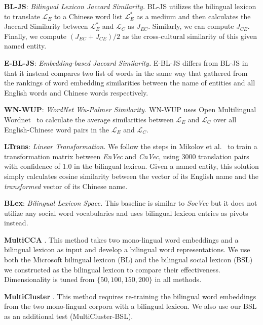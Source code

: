 \noindent
\textbf{BL-JS}: \textit{Bilingual Lexicon Jaccard Similarity.}
BL-JS utilizes the bilingual lexicon to translate $\mathcal{L}_E$  to a Chinese word list 
$\mathcal{L}_E^*$ as a medium and then calculates the Jaccard Similarity between 
$\mathcal{L}_E^*$ and $\mathcal{L}_C$ as $J_{EC}$. Similarly, we can compute $J_{CE}$. 
Finally, we compute $(J_{EC}+J_{CE})/{2}$ as the cross-cultural similarity 
of this given named entity.

\noindent
\textbf{E-BL-JS}: \textit {Embedding-based Jaccard Similarity.} 
E-BL-JS differs from BL-JS in that it instead compares two list of words in the same way that gathered from the
rankings of word embedding similarities between the name of entities and all English words 
and Chinese words respectively. 

\noindent
\textbf{WN-WUP}: \textit{WordNet Wu-Palmer Similarity.} 
WN-WUP uses Open Multilingual 
Wordnet~\cite{wang2013building} to calculate the average 
similarities between $\mathcal{L}_E$ and $\mathcal{L}_C$ over all English-Chinese word pairs in the $\mathcal{L}_E$ and $\mathcal{L}_C$.

\noindent\textbf{LTrans}: \textit {Linear Transformation.}
We follow the steps in Mikolov et al.~ 
to train a transformation matrix between \textit{EnVec} and \textit{CnVec}, 
using 3000 translation pairs with confidence of 1.0 in the bilingual lexicon. 
Given a named entity, this solution simply calculates cosine similarity 
between the vector of its English name and the \textit{transformed} vector 
of its Chinese name. 

\noindent\textbf{BLex}: \textit {Bilingual Lexicon Space.}
This baseline is similar to \textit{SocVec} but it does not 
utilize any social word vocabularies and  uses bilingual lexicon entries as pivots instead.
 
\noindent\textbf{MultiCCA}
\cite{ammar2016massively}. This method takes two mono-lingual word 
embeddings and a bilingual lexicon as input and develop a bilingual word 
representations.  We use both the Microsoft bilingual lexicon (BL)
and the bilingual social lexicon (BSL) we constructed as the bilingual lexicon
to compare their effectiveness. Dimensionality is tuned from 
$\{50,100,150,200\}$ in all methods.

\noindent\textbf{MultiCluster} \cite{ammar2016massively}.
This method requires re-training the bilingual word embeddings from the two mono-lingual corpora with a bilingual lexicon. We also use our BSL as 
an additional test (MultiCluster-BSL). 

